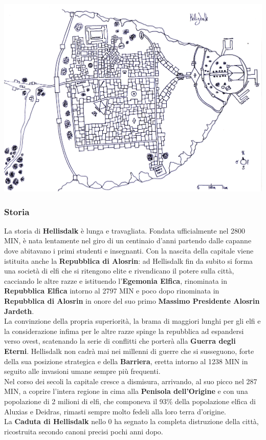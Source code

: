 \documentclass[10pt,twoside,onecolumn,openany]{book}
\begin{document}
\includegraphics[scale=0.6]{Hellisdalk}
\newpage
\subsubsection{Storia}
La storia di \textbf{Hellisdalk} è lunga e travagliata. Fondata ufficialmente nel 2800 MIN, è nata lentamente nel giro di un centinaio d'anni partendo dalle capanne dove abitavano i primi studenti e insegnanti. Con la nascita della capitale viene istituita anche la \textbf{Repubblica di Alosrin}: ad Hellisdalk fin da subito si forma una società di elfi che si ritengono elite e rivendicano il potere sulla città, cacciando le altre razze e istituendo l'\textbf{Egemonia Elfica}, rinominata in \textbf{Repubblica Elfica} intorno al 2797 MIN e poco dopo rinominata in \textbf{Repubblica di Alosrin} in onore del suo primo \textbf{Massimo Presidente Alosrin Jardeth}.\\
La convinzione della propria superiorità, la brama di maggiori lunghi per gli elfi e la considerazione infima per le altre razze spinge la repubblica ad espandersi verso ovest, scatenando la serie di conflitti che porterà alla \textbf{Guerra degli Eterni}. Hellisdalk non cadrà mai nei millenni di guerre che si susseguono, forte della sua posizione strategica e della \textbf{Barriera}, eretta intorno al 1238 MIN in seguito alle invasioni umane sempre più frequenti.\\
Nel corso dei secoli la capitale cresce a dismisura, arrivando, al suo picco nel 287 MIN, a coprire l'intera regione in cima alla \textbf{Penisola dell'Origine} e con una popolazione di 2 milioni di elfi, che componeva il 93\% della popolazione elfica di Aluxias e Deidras, rimasti sempre molto fedeli alla loro terra d'origine.\\
La \textbf{Caduta di Hellisdalk} nello 0 ha segnato la completa distruzione della città, ricostruita secondo canoni precisi pochi anni dopo.
\end{document}
